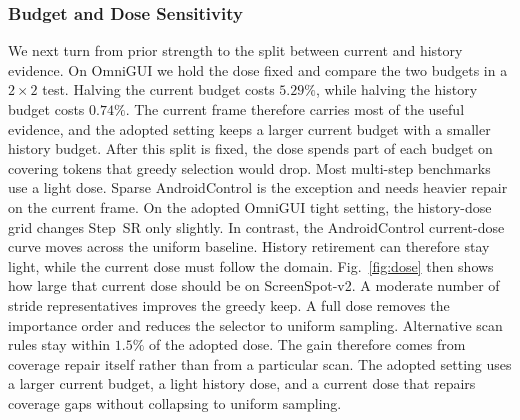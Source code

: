 \subsubsection{Budget and Dose Sensitivity}
We next turn from prior strength to the split between current and history evidence.
%
On OmniGUI we hold the dose fixed and compare the two budgets in a $2{\times}2$ test.
%
Halving the current budget costs $5.29\%$, while halving the history budget costs $0.74\%$.
%
The current frame therefore carries most of the useful evidence, and the adopted setting keeps a larger current budget with a smaller history budget.
%
After this split is fixed, the dose spends part of each budget on covering tokens that greedy selection would drop.
%
Most multi-step benchmarks use a light dose.
%
Sparse AndroidControl is the exception and needs heavier repair on the current frame.
%
On the adopted OmniGUI tight setting, the history-dose grid changes Step~SR only slightly.
%
In contrast, the AndroidControl current-dose curve moves across the uniform baseline.
%
History retirement can therefore stay light, while the current dose must follow the domain.
%
Fig.~\ref{fig:dose} then shows how large that current dose should be on ScreenSpot-v2.
%
A moderate number of stride representatives improves the greedy keep.
%
A full dose removes the importance order and reduces the selector to uniform sampling.
%
Alternative scan rules stay within $1.5\%$ of the adopted dose.
%
The gain therefore comes from coverage repair itself rather than from a particular scan.
%
The adopted setting uses a larger current budget, a light history dose, and a current dose that repairs coverage gaps without collapsing to uniform sampling.
%
